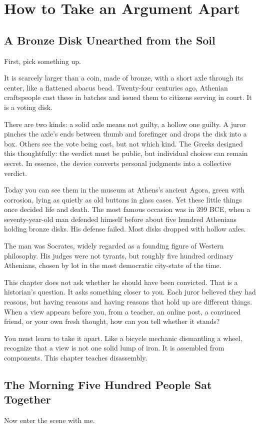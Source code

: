 \chapter{How to Take an Argument Apart}
\section{A Bronze Disk Unearthed from the Soil}
First, pick something up.

It is scarcely larger than a coin, made of bronze, with a short axle through its center, like a flattened abacus bead. Twenty-four centuries ago, Athenian craftspeople cast these in batches and issued them to citizens serving in court. It is a voting disk.

There are two kinds: a solid axle means not guilty, a hollow one guilty. A juror pinches the axle's ends between thumb and forefinger and drops the disk into a box. Others see the vote being cast, but not which kind. The Greeks designed this thoughtfully: the verdict must be public, but individual choices can remain secret. In essence, the device converts personal judgments into a collective verdict.

Today you can see them in the museum at Athens's ancient Agora, green with corrosion, lying as quietly as old buttons in glass cases. Yet these little things once decided life and death. The most famous occasion was in 399 BCE, when a seventy-year-old man defended himself before about five hundred Athenians holding bronze disks. His defense failed. Most disks dropped with hollow axles.

The man was Socrates, widely regarded as a founding figure of Western philosophy. His judges were not tyrants, but roughly five hundred ordinary Athenians, chosen by lot in the most democratic city-state of the time.

This chapter does not ask whether he should have been convicted. That is a historian's question. It asks something closer to you. Each juror believed they had reasons, but having reasons and having reasons that hold up are different things. When a view appears before you, from a teacher, an online post, a convinced friend, or your own fresh thought, how can you tell whether it stands?

You must learn to take it apart. Like a bicycle mechanic dismantling a wheel, recognize that a view is not one solid lump of iron. It is assembled from components. This chapter teaches disassembly.

\section{The Morning Five Hundred People Sat Together}
Now enter the scene with me.

